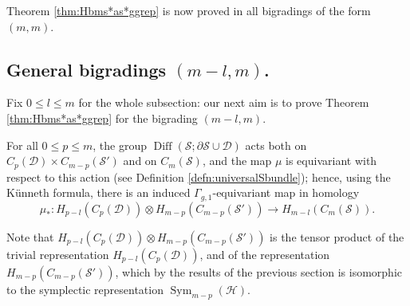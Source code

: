 \documentclass{amsart}
\theoremstyle{plain}
\theoremstyle{definition}
\newcommand{\D}{\mathcal{D}}
\renewcommand{\H}{\mathcal{H}}
\renewcommand{\S}{\mathcal{S}}
\renewcommand{\gg}{\Gamma_{g,1}}
\newcommand{\cms}{C_m(\S)}
\newcommand{\pa}[1]{\left(#1\right)}
\DeclareMathOperator{\Diff}{Diff}
\DeclareMathOperator{\Sym}{Sym}
\begin{document}
Theorem \ref{thm:Hbms*as*ggrep} is now proved in all bigradings of the form $(m,m)$.

\subsection{General bigradings \texorpdfstring{$(m-l,m)$}{(m-l,m)}.} Fix $0\leq l\leq m$ for the whole subsection: our next aim is to prove Theorem
\ref{thm:Hbms*as*ggrep} for the bigrading $(m-l,m)$.

For all $0\leq p\leq m$, the group $\Diff(\S;\partial\S\cup\D)$ acts both on $C_p(\D)\times C_{m-p}(\S')$
and on $\cms$, and the map $\mu$ is equivariant with respect to this action
(see Definition \ref{defn:universalSbundle});
hence, using the K\"{u}nneth formula, there is an induced $\gg$-equivariant map in homology
\begin{equation}
 \label{eq:mu*}
 \mu_*\colon H_{p-l}\pa{C_p(\D)}\otimes H_{m-p}\pa{C_{m-p}(\S')}\to H_{m-l}\pa{\cms}.
\end{equation}

Note that $H_{p-l}\pa{C_p(\D)}\otimes H_{m-p}\pa{C_{m-p}(\S')}$
is the tensor product of the trivial representation $H_{p-l}\pa{C_p(\D)}$, and
of the representation $H_{m-p}\pa{C_{m-p}(\S')}$, which by the results of the previous
section is isomorphic to the symplectic representation $\Sym_{m-p}(\H)$.
\end{document}

